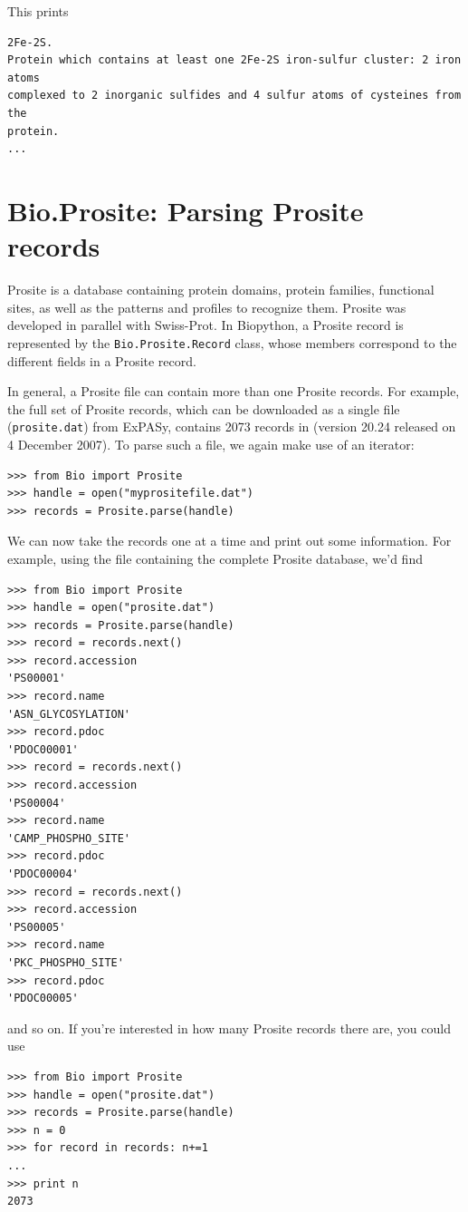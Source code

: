 \documentclass{report}
\begin{document}
This prints
\begin{verbatim}
2Fe-2S.
Protein which contains at least one 2Fe-2S iron-sulfur cluster: 2 iron atoms
complexed to 2 inorganic sulfides and 4 sulfur atoms of cysteines from the
protein.
...
\end{verbatim}

\section{Bio.Prosite: Parsing Prosite records}

Prosite is a database containing protein domains, protein families, functional sites, as well as the patterns and profiles to recognize them. Prosite was developed in parallel with Swiss-Prot. In Biopython, a Prosite record is represented by the \verb|Bio.Prosite.Record| class, whose members correspond to the different fields in a Prosite record.

In general, a Prosite file can contain more than one Prosite records. For example, the full set of Prosite records, which can be downloaded as a single file (\verb|prosite.dat|) from ExPASy, contains 2073 records in (version 20.24 released on 4 December 2007). To parse such a file, we again make use of an iterator:

\begin{verbatim}
>>> from Bio import Prosite
>>> handle = open("myprositefile.dat")
>>> records = Prosite.parse(handle)
\end{verbatim}

We can now take the records one at a time and print out some information. For example, using the file containing the complete Prosite database, we'd find
\begin{verbatim}
>>> from Bio import Prosite
>>> handle = open("prosite.dat")
>>> records = Prosite.parse(handle)
>>> record = records.next()
>>> record.accession
'PS00001'
>>> record.name
'ASN_GLYCOSYLATION'
>>> record.pdoc
'PDOC00001'
>>> record = records.next()
>>> record.accession
'PS00004'
>>> record.name
'CAMP_PHOSPHO_SITE'
>>> record.pdoc
'PDOC00004'
>>> record = records.next()
>>> record.accession
'PS00005'
>>> record.name
'PKC_PHOSPHO_SITE'
>>> record.pdoc
'PDOC00005'
\end{verbatim}
and so on. If you're interested in how many Prosite records there are, you could use
\begin{verbatim}
>>> from Bio import Prosite
>>> handle = open("prosite.dat")
>>> records = Prosite.parse(handle)
>>> n = 0
>>> for record in records: n+=1
...
>>> print n
2073
\end{verbatim}
\end{document}
